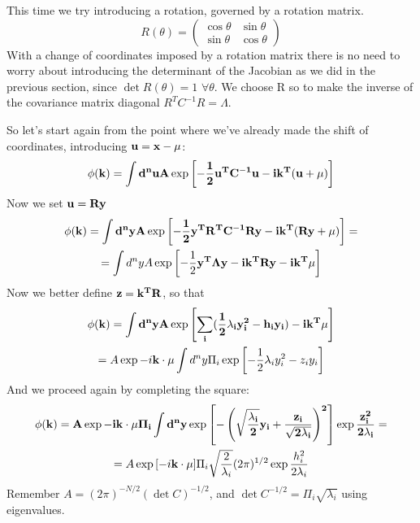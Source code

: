 \documentclass[a4paper,11pt,fleqn]{article}
\begin{document}
This time we try introducing a rotation, governed by a rotation matrix.
\begin{equation}
    R(\theta) = 
    \begin{pmatrix}
        \cos{\theta} & \sin{\theta} \\
        \sin{\theta} & \cos{\theta} 
    \end{pmatrix}
\end{equation}
With a change of coordinates imposed by a rotation matrix there is no need
to worry about introducing the determinant of the Jacobian as we did in the
previous section, since $\det{R(\theta)}=1$ $\forall \theta$.
We choose R so to make the inverse of the covariance matrix diagonal $R^T C^{-1} R = \Lambda$.

So let's start again from the point where we've already made the shift of 
coordinates, introducing $\bf{u} = \bf{x}-\bf{\mu}$:
\begin{equation*}
    \phi(\bf{k})= \int d^n u A \exp{\left[ -\frac{1}{2}\bf{u}^TC^{-1}\bf{u} - i\bf{k}^T(\bf{u}+\bf{\mu}) \right]}
\end{equation*}
Now we set $\bf{u} = R\bf{y}$
\begin{gather*}
    \phi(\bf{k})= \int d^n y A \exp{\left[ -\frac{1}{2}\bf{y}^T R^T C^{-1} R\bf{y} - i\bf{k}^T(R\bf{y}+\bf{\mu}) \right]} = \\
    = \int d^n y A \exp{\left[ -\frac{1}{2}\bf{y}^T \Lambda \bf{y} - i\bf{k}^T R \bf{y} -i \bf{k}^T\bf{\mu} \right]}
\end{gather*}
Now we better define $\bf{z} = \bf{k}^T R$, so that 
\begin{gather*}
    \phi(\bf{k})= \int d^n y A \exp{\left[ \sum_i(\frac{1}{2}\lambda_iy_i^2-h_iy_i) -i \bf{k}^T\bf{\mu} \right]} \\
    = A \exp{-i\bf{k}\cdot \bf{\mu}} \int d^ny \Pi_i \exp{\left[-\frac{1}{2}\lambda_i y_i^2 -z_i y_i\right]}  
\end{gather*}
And we proceed again by completing the square:
\begin{gather*}
    \phi(\bf{k}) = A \exp{-i\bf{k}\cdot \bf{\mu}} \Pi_i \int d^ny \exp{\left[-\left(\sqrt{\frac{\lambda_i}{2}}y_i + \frac{z_i}{\sqrt{2\lambda_i}}\right)^2 \right]} \exp{\frac{z_i^2}{2\lambda_i}} =  \\
    = A \exp{\left[-i\bf{k}\cdot\bf{\mu} \right]} \Pi_i \sqrt{\frac{2}{\lambda_i}}(2\pi)^{1/2}\exp{\frac{h_i^2}{2\lambda_i}}
\end{gather*}
Remember $A=(2\pi)^{-N/2}(\det{C})^{-1/2}$, and $\det{C}^{-1/2}=\Pi_i\sqrt{\lambda_i}$ using eigenvalues.
\end{document}

